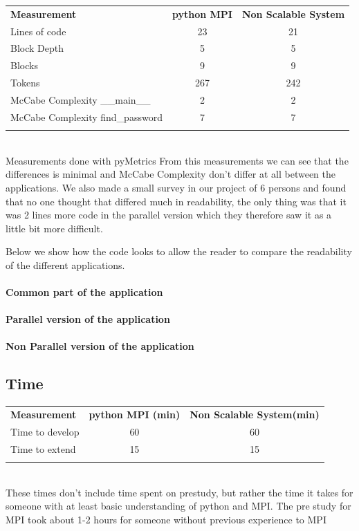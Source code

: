 \documentclass{article}
\begin{document}
\begin{tabular}{l c c}
  \rowcolor[gray]{0.5}
  {\bf Measurement} & {\bf python MPI} & {\bf Non Scalable System} \\
  Lines of code &  23  &  21 \\
  Block Depth   &   5  &   5  \\
  Blocks        &   9  &   9  \\
  Tokens        & 267  & 242  \\
  McCabe Complexity\cite{mccabe1976complexity} \_\_main\_\_ & 2  & 2 \\
  McCabe Complexity\cite{mccabe1976complexity} find\_password & 7  & 7  \\
\rowcolor[gray]{0.5}
\end{tabular}
\\\small{Measurements done with pyMetrics\cite{pymetrics}}
\newline
From this measurements we can see that the differences is minimal and
McCabe Complexity\cite{mccabe1976complexity} don't differ at all between
the applications. We also made a small survey in our project of 6 persons
and found that no one thought that differed much in readability, the only
thing was that it was 2 lines more code in the parallel version which they
therefore saw it as a little bit more difficult. 
\newline

Below we show how the code looks to allow the reader to compare the readability
of the different applications. 

\paragraph{Common part of the application}

\paragraph{Parallel version of the application}

\paragraph{Non Parallel version of the application}


\subsection{Time}
\begin{tabular}{l c c}
  \rowcolor[gray]{0.5}
  {\bf Measurement} & {\bf python MPI (min)} & {\bf Non Scalable System(min)} \\
  Time to develop &  60  &  60 \\
  Time to extend   &   15  &  15  \\
\rowcolor[gray]{0.5}
\end{tabular}
\\\small{These times don't include time spent on prestudy, but rather the time
it takes for someone with at least basic understanding of python and MPI. The
pre study for MPI took about 1-2 hours for someone without previous experience
to MPI}
\end{document}
